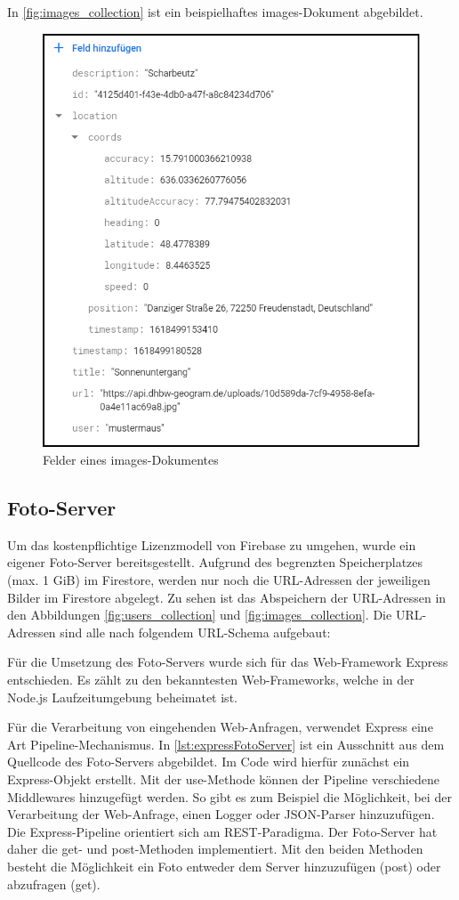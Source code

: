 In \autoref{fig:images_collection} ist ein beispielhaftes images-Dokument abgebildet.

\begin{figure}[H]
    \centering
    \includegraphics[width=.7\linewidth]{images/collection_images.png}
    \caption{Felder eines \glqq images\grqq{}-Dokumentes}
    \label{fig:images_collection}
\end{figure}

\subsection{Foto-Server\label{sup3.2.3:Unterpunkt-3}}

Um das kostenpflichtige Lizenzmodell von Firebase zu umgehen, wurde ein eigener Foto-Server bereitsgestellt. Aufgrund des begrenzten Speicherplatzes (max. 1 GiB) im Firestore, werden nur noch die URL-Adressen der jeweiligen Bilder im Firestore abgelegt. Zu sehen ist das Abspeichern der URL-Adressen in den Abbildungen \autoref{fig:users_collection} und \autoref{fig:images_collection}. Die URL-Adressen sind alle nach folgendem URL-Schema aufgebaut:

\noindent{}

Für die Umsetzung des Foto-Servers wurde sich für das Web-Framework \glqq Express\grqq{} entschieden. Es zählt zu den bekanntesten Web-Frameworks, welche in der Node.js Laufzeitumgebung beheimatet ist.

Für die Verarbeitung von eingehenden Web-Anfragen, verwendet Express eine Art Pipeline-Mechanismus. In \autoref{lst:expressFotoServer} ist ein Ausschnitt aus dem Quellcode des Foto-Servers abgebildet. Im Code wird hierfür zunächst ein Express-Objekt erstellt. Mit der use-Methode können der Pipeline verschiedene Middlewares hinzugefügt werden. So gibt es zum Beispiel die Möglichkeit, bei der Verarbeitung der Web-Anfrage, einen Logger oder JSON-Parser hinzuzufügen. Die Express-Pipeline orientiert sich am REST-Paradigma. Der Foto-Server hat daher die get- und post-Methoden implementiert. Mit den beiden Methoden besteht die Möglichkeit ein Foto entweder dem Server hinzuzufügen (post) oder abzufragen (get).

